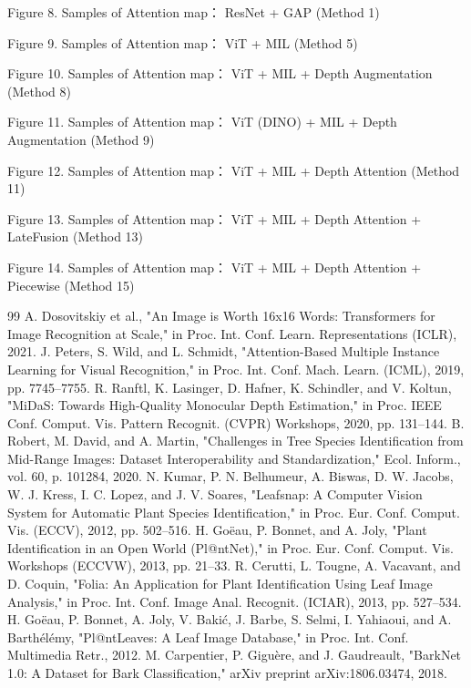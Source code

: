 \documentclass{article}
\begin{document}
Figure 8. Samples of Attention map： ResNet + GAP (Method 1)

Figure 9. Samples of Attention map： ViT + MIL  (Method 5)

Figure 10. Samples of Attention map： ViT + MIL + Depth Augmentation  (Method 8)

Figure 11. Samples of Attention map： ViT (DINO) + MIL + Depth Augmentation (Method 9)

Figure 12. Samples of Attention map： ViT + MIL + Depth Attention (Method 11)

Figure 13. Samples of Attention map： ViT + MIL + Depth Attention + LateFusion (Method 13)

Figure 14. Samples of Attention map： ViT + MIL + Depth Attention + Piecewise (Method 15)

\begin{thebibliography}{99}
 A. Dosovitskiy et al., "An Image is Worth 16x16 Words: Transformers for Image Recognition at Scale," in Proc. Int. Conf. Learn. Representations (ICLR), 2021.
 J. Peters, S. Wild, and L. Schmidt, "Attention-Based Multiple Instance Learning for Visual Recognition," in Proc. Int. Conf. Mach. Learn. (ICML), 2019, pp. 7745–7755.
 R. Ranftl, K. Lasinger, D. Hafner, K. Schindler, and V. Koltun, "MiDaS: Towards High-Quality Monocular Depth Estimation," in Proc. IEEE Conf. Comput. Vis. Pattern Recognit. (CVPR) Workshops, 2020, pp. 131–144.
 B. Robert, M. David, and A. Martin, "Challenges in Tree Species Identification from Mid-Range Images: Dataset Interoperability and Standardization," Ecol. Inform., vol. 60, p. 101284, 2020.
 N. Kumar, P. N. Belhumeur, A. Biswas, D. W. Jacobs, W. J. Kress, I. C. Lopez, and J. V. Soares, "Leafsnap: A Computer Vision System for Automatic Plant Species Identification," in Proc. Eur. Conf. Comput. Vis. (ECCV), 2012, pp. 502–516.
 H. Goëau, P. Bonnet, and A. Joly, "Plant Identification in an Open World (Pl@ntNet)," in Proc. Eur. Conf. Comput. Vis. Workshops (ECCVW), 2013, pp. 21–33.
 R. Cerutti, L. Tougne, A. Vacavant, and D. Coquin, "Folia: An Application for Plant Identification Using Leaf Image Analysis," in Proc. Int. Conf. Image Anal. Recognit. (ICIAR), 2013, pp. 527–534.
 H. Goëau, P. Bonnet, A. Joly, V. Bakić, J. Barbe, S. Selmi, I. Yahiaoui, and A. Barthélémy, "Pl@ntLeaves: A Leaf Image Database," in Proc. Int. Conf. Multimedia Retr., 2012.
 M. Carpentier, P. Giguère, and J. Gaudreault, "BarkNet 1.0: A Dataset for Bark Classification," arXiv preprint arXiv:1806.03474, 2018.

\end{thebibliography}
\end{document}
